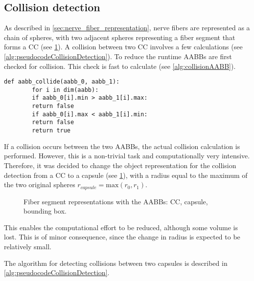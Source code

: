 \subsection{Collision detection}
\label{sec:collisionDetection}
%
As described in \cref{sec:nerve_fiber_representation}, nerve fibers are represented as a chain of spheres, with two adjacent spheres representing a fiber segment that forms a \ac{CC} (see \cref{fig:conical_capsule}).
A collision between two \ac{CC} involves a few calculations (see \cref{alg:pseudocodeCollisionDetection}).
To reduce the runtime \acp{AABB} are first checked for collision.
This check is fast to calculate (see \cref{alg:collisionAABB}).
\begin{lstfloat}[!tb]
    \lstset{style=python}
    \begin{lstlisting}[]
        def aabb_collide(aabb_0, aabb_1):
        for i in dim(aabb):
        if aabb_0[i].min > aabb_1[i].max:
        return false
        if aabb_0[i].max < aabb_1[i].min:
        return false
        return true
    \end{lstlisting}
    \caption[]{Calculation if a collision between \acp{AABB} exists.}
    \label{alg:collisionAABB}
\end{lstfloat}
%
%
If a collision occurs between the two \acp{AABB}, the actual collision calculation is performed.
However, this is a non-trivial task and computationally very intensive.
Therefore, it was decided to change the object representation for the collision detection from a \ac{CC} to a capsule (see \cref{fig:conical_capsule}), with a radius equal to the maximum of the two original spheres $r_{\mathit{capsule}} = \mathrm{max}(r_0, r_1)$.
%
\begin{figure}[!t]
    \centering
    \setlength{\tikzwidth}{0.6\textwidth}
    \tikzset{external/export=false}
    \caption[]{Fiber segment representations with the \acp{AABB}: \raisebox{.25em}{\tikz \draw[black](0,0)--(0.275,0);} \ac{CC}, \raisebox{.25em}{\tikz \draw[blue, dash pattern=on 2.5pt off 2.5pt](0,0)--(0.275,0);} capsule, \raisebox{.25em}{\tikz \draw[red, dash pattern={on 2.5pt off 0.9pt on 0.42pt off 0.9pt}](0,0)--(0.275,0);} bounding box.}
    \label{fig:conical_capsule}
\end{figure}
%
This enables the computational effort to be reduced, although some volume is lost.
This is of minor consequence, since the change in radius is expected to be relatively small.
\par
%
The algorithm for detecting collisions between two capsules is described in \cref{alg:pseudocodeCollisionDetection}.
